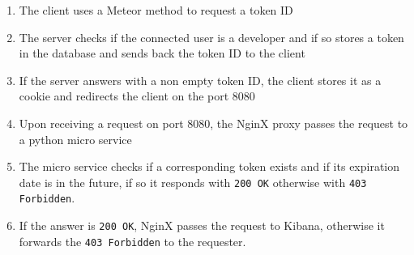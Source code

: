 \begin{enumerate}
	\item The client uses a Meteor method to request a token ID
	\item The server checks if the connected user is a developer and if so stores a token in the database and sends back the token ID to the client
	\item If the server answers with a non empty token ID, the client stores it as a cookie and redirects the client on the port 8080
	\item Upon receiving a request on port 8080, the NginX proxy passes the request to a python micro service
	\item The micro service checks if a corresponding token exists and if its expiration date is in the future, if so it responds with \texttt{200 OK} otherwise with \texttt{403 Forbidden}.
	\item If the answer is \texttt{200 OK}, NginX passes the request to Kibana, otherwise it forwards the \texttt{403 Forbidden} to the requester.
\end{enumerate}